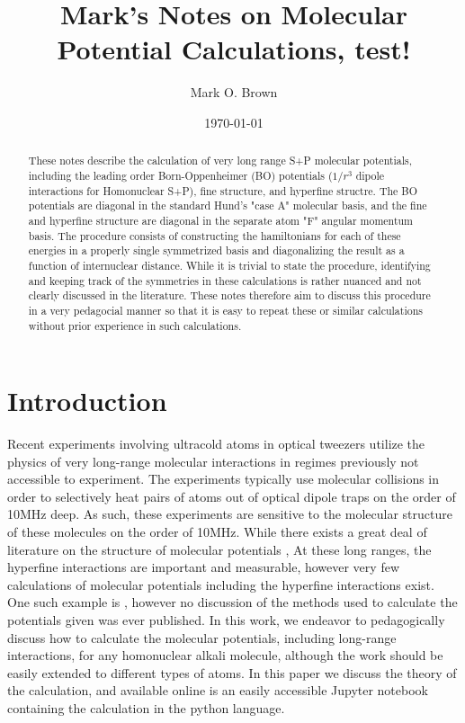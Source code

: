 \documentclass[prl, longbibliography]{revtex4-2}
\begin{document}
\title{Mark's Notes on Molecular Potential Calculations, test!}
\author{Mark O. Brown}
\date{\today}

\begin{abstract}
These notes describe the calculation of very long range S+P molecular potentials, including the leading order Born-Oppenheimer (BO) potentials ($1/r^3$ dipole interactions for Homonuclear S+P), fine structure, and hyperfine structre. 
The BO potentials are diagonal in the standard Hund's "case A" molecular basis, and the fine and hyperfine structure are diagonal in the separate atom "F" angular momentum basis. 
The procedure consists of constructing the hamiltonians for each of these energies in a properly single symmetrized  basis and diagonalizing the result as a function of internuclear distance.
While it is trivial to state the procedure, identifying and keeping track of the symmetries in these calculations is rather nuanced and not clearly discussed in the literature. 
These notes therefore aim to discuss this procedure in a very pedagocial manner so that it is easy to repeat these or similar calculations without prior experience in such calculations. 
\end{abstract}

\maketitle

\section{Introduction}

Recent experiments \cite{brown_gray-molasses_2019} involving ultracold atoms in optical tweezers utilize the physics of very long-range molecular interactions in regimes previously not accessible to experiment. 
The experiments typically use molecular collisions in order to selectively heat pairs of atoms out of optical dipole traps on the order of 10MHz deep. 
As such, these experiments are sensitive to the molecular structure of these molecules on the order of 10MHz. While there exists a great deal of literature on the structure of molecular potentials \cite{jones_ultracold_2006}, At these long ranges, the hyperfine interactions are important and measurable, however very few calculations of molecular potentials including the hyperfine interactions exist. 
One such example is \cite{kemmann_near-threshold_2004}, however no discussion of the methods used to calculate the potentials given was ever published. 
In this work, we endeavor to pedagogically discuss how to calculate the molecular potentials, including long-range interactions, for any homonuclear alkali molecule, although the work should be easily extended to different types of atoms. 
In this paper we discuss the theory of the calculation, and available online is an easily accessible Jupyter notebook containing the calculation in the python language.
\end{document}

